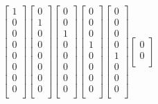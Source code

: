 \documentclass[a4paper,10pt]{article}
\begin{document}
\begin{equation*}
\begin{aligned}
{\begin{bmatrix}
1 \\
0 \\
0 \\
0 \\
0 \\
0 \\
0 \\
0 \\
\end{bmatrix}}
{\begin{bmatrix}
0 \\
1 \\
0 \\
0 \\
0 \\
0 \\
0 \\
0 \\
\end{bmatrix}}
{\begin{bmatrix}
0 \\
0 \\
1 \\
0 \\
0 \\
0 \\
0 \\
0 \\
\end{bmatrix}}
{\begin{bmatrix}
0 \\
0 \\
0 \\
1 \\
0 \\
0 \\
0 \\
0 \\
\end{bmatrix}}
{\begin{bmatrix}
0 \\
0 \\
0 \\
0 \\
1 \\
0 \\
0 \\
0 \\
\end{bmatrix}}
{\begin{bmatrix}
0 \\
0 \\

\end{bmatrix}}
\end{aligned}
\end{equation*}
\end{document}
